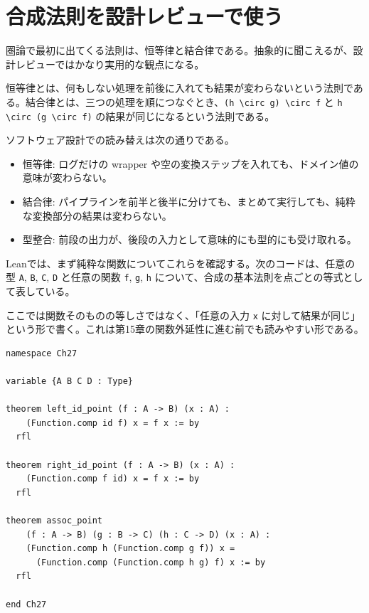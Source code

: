 \section{合成法則を設計レビューで使う}

圏論で最初に出てくる法則は、恒等律と結合律である。抽象的に聞こえるが、設計レビューではかなり実用的な観点になる。

\begin{definitionbox}
恒等律とは、何もしない処理を前後に入れても結果が変わらないという法則である。結合律とは、三つの処理を順につなぐとき、\texttt{(h \textbackslash{}circ g) \textbackslash{}circ f} と \texttt{h \textbackslash{}circ (g \textbackslash{}circ f)} の結果が同じになるという法則である。
\end{definitionbox}

ソフトウェア設計での読み替えは次の通りである。

\begin{itemize}
\item 恒等律: ログだけの wrapper や空の変換ステップを入れても、ドメイン値の意味が変わらない。
\item 結合律: パイプラインを前半と後半に分けても、まとめて実行しても、純粋な変換部分の結果は変わらない。
\item 型整合: 前段の出力が、後段の入力として意味的にも型的にも受け取れる。
\end{itemize}

Leanでは、まず純粋な関数についてこれらを確認する。次のコードは、任意の型 \texttt{A}, \texttt{B}, \texttt{C}, \texttt{D} と任意の関数 \texttt{f}, \texttt{g}, \texttt{h} について、合成の基本法則を点ごとの等式として表している。

\begin{leanbox}
ここでは関数そのものの等しさではなく、「任意の入力 \texttt{x} に対して結果が同じ」という形で書く。これは第15章の関数外延性に進む前でも読みやすい形である。
\end{leanbox}

\begin{listing}[htbp]
\begin{verbatim}
namespace Ch27

variable {A B C D : Type}

theorem left_id_point (f : A -> B) (x : A) :
    (Function.comp id f) x = f x := by
  rfl

theorem right_id_point (f : A -> B) (x : A) :
    (Function.comp f id) x = f x := by
  rfl

theorem assoc_point
    (f : A -> B) (g : B -> C) (h : C -> D) (x : A) :
    (Function.comp h (Function.comp g f)) x =
      (Function.comp (Function.comp h g) f) x := by
  rfl

end Ch27
\end{verbatim}
\caption{関数合成の恒等律と結合律}
\label{lst:ch27-composition-laws}
\end{listing}

